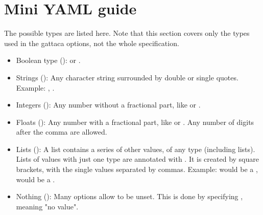 \section{Mini YAML guide}
\label{miniyamlguide}

The possible  types are listed here. Note that this section covers only the types used in the \gls{gattaca} options, not the whole  specification.

\begin{itemize}
    \item Boolean type ():  or .
    \item Strings (): Any character string surrounded by double or single quotes. Example: , .
    \item Integers (): Any number without a fractional part, like  or .
    \item Floats (): Any number with a fractional part, like  or . Any number of digits after the comma are allowed.
    \item Lists (): A list contains a series of other values, of any type (including lists). Lists of values with just one type are annotated with . It is created by square brackets, with the single values separated by commas. Example: \mono{[1, 2, 3]} would be a ,  would be a .
    \item Nothing (): Many options allow to be unset. This is done by specifying , meaning "no value".
\end{itemize}
